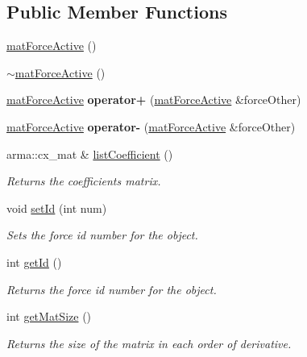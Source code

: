 \subsection*{Public Member Functions}
\begin{DoxyCompactItemize}
\item 
\hyperlink{classosea_1_1ofreq_1_1mat_force_active_addc507c90f98f3a9bb9bfe57897df3ca}{mat\-Force\-Active} ()
\item 
\hyperlink{classosea_1_1ofreq_1_1mat_force_active_aba1957829e2109f03c6fc03990258210}{$\sim$mat\-Force\-Active} ()
\item 
\hypertarget{classosea_1_1ofreq_1_1mat_force_active_a8bc32fc773bd6c29d8bd7790194a10cf}{\hyperlink{classosea_1_1ofreq_1_1mat_force_active}{mat\-Force\-Active} {\bfseries operator+} (\hyperlink{classosea_1_1ofreq_1_1mat_force_active}{mat\-Force\-Active} \&force\-Other)}\label{classosea_1_1ofreq_1_1mat_force_active_a8bc32fc773bd6c29d8bd7790194a10cf}

\item 
\hypertarget{classosea_1_1ofreq_1_1mat_force_active_a150bda87debf622dacb439e8e983fa3c}{\hyperlink{classosea_1_1ofreq_1_1mat_force_active}{mat\-Force\-Active} {\bfseries operator-\/} (\hyperlink{classosea_1_1ofreq_1_1mat_force_active}{mat\-Force\-Active} \&force\-Other)}\label{classosea_1_1ofreq_1_1mat_force_active_a150bda87debf622dacb439e8e983fa3c}

\item 
arma\-::cx\-\_\-mat \& \hyperlink{classosea_1_1ofreq_1_1mat_force_active_ab2cb4bbd11161f8c2944675815dea81c}{list\-Coefficient} ()
\begin{DoxyCompactList}\small\item\em Returns the coefficients matrix. \end{DoxyCompactList}\item 
void \hyperlink{classosea_1_1ofreq_1_1mat_force_active_a2784051c78388741bf1cf66d18df0b2c}{set\-Id} (int num)
\begin{DoxyCompactList}\small\item\em Sets the force id number for the object. \end{DoxyCompactList}\item 
int \hyperlink{classosea_1_1ofreq_1_1mat_force_active_a48a33b65af2085268a2f03fb212a39d3}{get\-Id} ()
\begin{DoxyCompactList}\small\item\em Returns the force id number for the object. \end{DoxyCompactList}\item 
int \hyperlink{classosea_1_1ofreq_1_1mat_force_active_aa17a21eb9a9ea9e1a36fae4dbc2b09bf}{get\-Mat\-Size} ()
\begin{DoxyCompactList}\small\item\em Returns the size of the matrix in each order of derivative. \end{DoxyCompactList}\end{DoxyCompactItemize}
